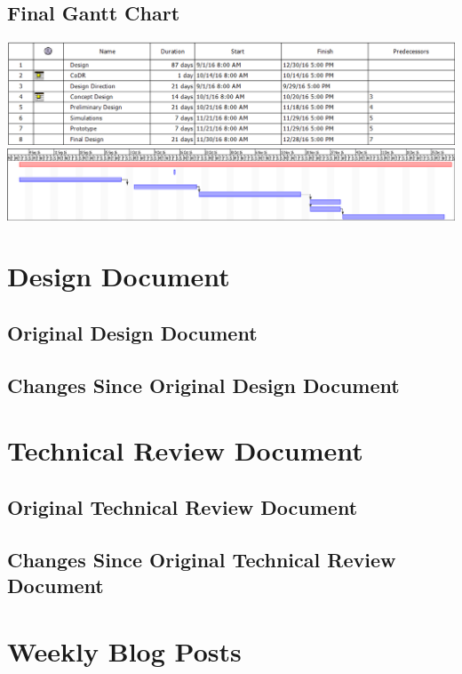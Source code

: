 \documentclass[letterpaper,10pt]{article}
\begin{document}
\subsection{Final Gantt Chart}
\includegraphics[width=\textwidth]{./images/gantttable}
\includegraphics[width=\textwidth]{./images/ganttchart}

\section{Design Document}
\subsection{Original Design Document}


\subsection{Changes Since Original Design Document}


\section{Technical Review Document}
\subsection{Original Technical Review Document}


\subsection{Changes Since Original Technical Review Document}


\section{Weekly Blog Posts}
\end{document}
